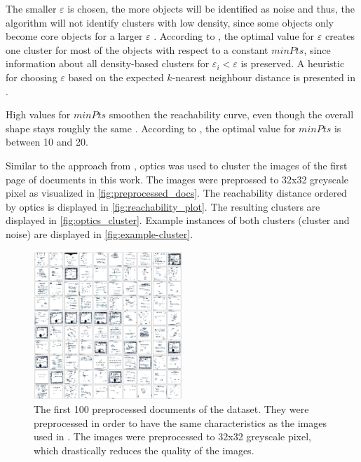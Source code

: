The smaller $\varepsilon$ is chosen, the more objects will be identified as noise and thus, the algorithm will not identify clusters with low density, 
since some objects only become core objects for a larger $\varepsilon$ \cite{OPTICS1999}.
According to \citeauthor{OPTICS1999}, the optimal value for $\varepsilon$ creates one cluster for most of the objects with respect to a constant $minPts$,
since information about all density-based clusters for $\varepsilon_i < \varepsilon$ is preserved.
A heuristic for choosing $\varepsilon$ based on the expected $k$-nearest neighbour distance is presented in \cite{OPTICS1999}.

High values for $minPts$ smoothen the reachability curve, even though the overall shape stays roughly the same \cite{OPTICS1999}.
According to \citeauthor{OPTICS1999}, the optimal value for $minPts$ is between 10 and 20.

Similar to the approach from \cite{OPTICS1999}, \ac{optics} was used to cluster the images of the first page of documents in this work.
The images were preprossed to 32x32 greyscale pixel as visualized in \autoref{fig:preprocessed_docs}.
The reachability distance ordered by \ac{optics} is displayed in \autoref{fig:reachability_plot}.
The resulting clusters are displayed in \autoref{fig:optics_cluster}.
Example instances of both clusters (cluster and noise) are displayed in \autoref{fig:example-cluster}.

\begin{figure}[htp] %
    \centering
    \includegraphics[width=0.5\textwidth]{images/preprocessed_docs.pdf}
    \caption{The first 100 preprocessed documents of the dataset.
    They were preprocessed in order to have the same characteristics as the images used in \cite{OPTICS1999}.
    The images were preprocessed to 32x32 greyscale pixel, which drastically reduces the quality of the images.
    }
    \label{fig:preprocessed_docs}
\end{figure}


